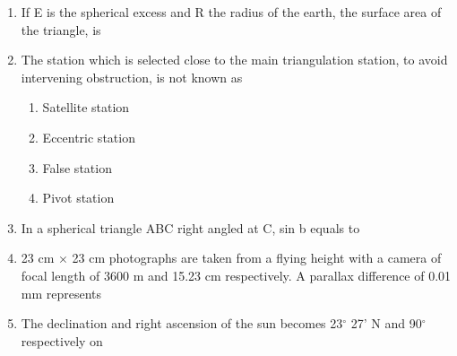 \documentclass[11pt,a4paper]{article}
\begin{document}
\begin{enumerate}
\begin{enumerate*}[itemjoin=\qquad, label=\Alph*.]
\end{enumerate*}
\item{If E is the spherical excess and R the radius of the earth, the surface area of the triangle, is}
\\
\item{The station which is selected close to the main triangulation station, to avoid intervening obstruction, is not known as}
\begin{enumerate}[label=\Alph*.]
\item{Satellite station}
\item{Eccentric station}
\item{False station}
\item{Pivot station}
\end{enumerate}
\item{In a spherical triangle ABC right angled at C, sin b equals to}
\\
\item{23 cm $\times$ 23 cm photographs are taken from a flying height with a camera of focal length of 3600 m and 15.23 cm respectively. A parallax difference of 0.01 mm represents
}
\\
\item{The declination and right ascension of the sun becomes 23$^\circ$ 27' N and 90$^\circ$ respectively on
}
\end{enumerate}
\end{document}
